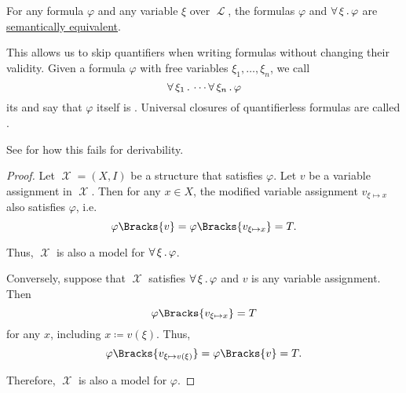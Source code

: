 \begin{proposition}\label{thm:implicit_universal_quantification}
  For any formula \( \varphi \) and any variable \( \xi \) over \( \mscrL \), the formulas \( \varphi \) and \( \forall \thinspace \xi \thinspace . \thinspace \varphi \) are \hyperref[def:first_order_semantics/equivalence]{semantically equivalent}.

  This allows us to skip quantifiers when writing formulas without changing their validity. Given a formula \( \varphi \) with free variables \( \xi_1, \ldots, \xi_n \), we call
  \begin{equation*}
    \forall \thinspace \xi_1 \thinspace . \thinspace \cdots \forall \thinspace \xi_n \thinspace . \thinspace \varphi
  \end{equation*}
  its  and say that \( \varphi \) itself is . Universal closures of quantifierless formulas are called .

  See  for how this fails for derivability.
\end{proposition}
\begin{proof}
  Let \( \mscrX = (X, I) \) be a structure that satisfies \( \varphi \). Let \( v \) be a variable assignment in \( \mscrX \). Then for any \( x \in X \), the modified variable assignment \( v_{\xi \mapsto x} \) also satisfies \( \varphi \), i.e.
  \begin{equation*}
    \varphi\Bracks{v} = \varphi\Bracks{v_{\xi \mapsto x}} = T.
  \end{equation*}

  Thus, \( \mscrX \) is also a model for \( \forall \thinspace \xi \thinspace . \thinspace \varphi \).

  Conversely, suppose that \( \mscrX \) satisfies \( \forall \thinspace \xi \thinspace . \thinspace \varphi \) and \( v \) is any variable assignment. Then
  \begin{equation*}
    \varphi\Bracks{v_{\xi \mapsto x}} = T
  \end{equation*}
  for any \( x \), including \( x \coloneqq v(\xi) \). Thus,
  \begin{equation*}
    \varphi\Bracks{v_{\xi \mapsto v(\xi)}} = \varphi\Bracks{v} = T.
  \end{equation*}

  Therefore, \( \mscrX \) is also a model for \( \varphi \).
\end{proof}

